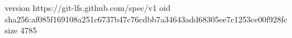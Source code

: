 version https://git-lfs.github.com/spec/v1
oid sha256:af085f169108a251c6737b47c76cdbb7a34643add68305ee7c1253ce00f928fc
size 4785
